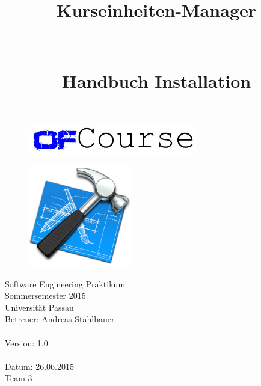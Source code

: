 \documentclass[a4paper, 12pt]{scrreprt}
\begin{document}
	\thispagestyle{plain}
	
	\begin{titlepage}
		\begin{center}
			\begin{figure}[ht]
				\centering
				\includegraphics[width=0.66\textwidth, angle=0]{logo/name_blau_ofCourse.jpg}
			\end{figure}
			
			\begin{title}
				\title{\Huge{\textbf{Kurseinheiten-Manager \\ \ \\ 
							\ \\
							Handbuch Installation
							}}}
			\begin{figure}[th]
				\centering
				\includegraphics[width=0.40\textwidth, angle=0]{Grafiken/installation-instructions-icon}
			\end{figure}
				
			\end{title}
			\hspace{3cm}
			
			Software Engineering Praktikum \\
			Sommersemester 2015\\
			Universität Passau\\
			
			
			Betreuer: Andreas Stahlbauer \\
        	\hspace{1,5cm}\\
        	Version: 1.0 \\
        	\hspace{1,5cm}\\
        	Datum: 26.06.2015\\[28pt]
        	Team 3 \\


\end{center}
\end{titlepage}
\end{document}
